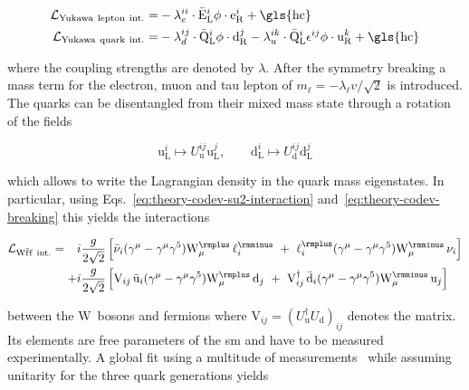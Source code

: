\begin{subequations}
\begin{align}
\mathcal{L}_\mathrm{Yukawa~lepton~int.}=&-\lambda_{e}^{ii}\cdot\bar{\mathrm{E}}^{i}_\mathrm{L}\phi\cdot\mathrm{e}^{i}_\mathrm{R}+\mathrm{\gls{hc}} \label{eq:theory-lepton-yukawa}\\
\mathcal{L}_\mathrm{Yukawa~quark~int.}=&-\lambda_{d}^{ij}\cdot\bar{\mathrm{Q}}^{i}_\mathrm{L}\phi\cdot\mathrm{d}^{j}_\mathrm{R}-\lambda_{u}^{ik}\cdot\bar{\mathrm{Q}}^{i}_\mathrm{L}\epsilon^{ij}\phi\cdot\mathrm{u}^{k}_\mathrm{R} +\mathrm{\gls{hc}} \label{eq:theory-quark-yukawa}
\end{align}
\end{subequations}

where the coupling strengths are denoted by $\lambda$. After the symmetry breaking a mass term for the electron, muon and tau lepton of $m_\ell=-\lambda_\ell v/\sqrt{2}$ is introduced. The quarks can be disentangled from their mixed mass state through a rotation of the fields 

\begin{equation}
\mathrm{u}^{i}_\mathrm{L}\mapsto U^{ij}_\mathrm{u}\mathrm{u}^{j}_\mathrm{L},\qquad \mathrm{d}^{i}_\mathrm{L}\mapsto U^{ij}_\mathrm{d}\mathrm{d}^{j}_\mathrm{L}
\end{equation}

which allows to write the Lagrangian density in the quark mass eigenstates. In particular, using Eqs.~\ref{eq:theory-codev-su2-interaction} and~\ref{eq:theory-codev-breaking} this yields the interactions

\begin{subequations}
\begin{align}
\mathcal{L}_{\mathrm{W}\bar{\mathrm{f}}\mathrm{f}~\mathrm{int.}}=\hphantom{+}i&\frac{g}{2\sqrt{2}}\,\Big[\bar{\nu}_{i}(\gamma^\mu-\gamma^\mu\gamma^5) \mathrm{W}^{\rmplus}_\mu\,\ell^{\rmminus}_{i}~+~{\ell}^{\rmplus}_{i}(\gamma^\mu-\gamma^\mu\gamma^5) \mathrm{W}^{\rmminus}_\mu\,\nu_{i}\Big]\nonumber\\
+i&\frac{g}{2\sqrt{2}}\,\Big[\mathrm{V}_{ij}\,\bar{\mathrm{u}}_{i}(\gamma^\mu-\gamma^\mu\gamma^5) \mathrm{W}^{\rmplus}_\mu\,\mathrm{d}_{j}~+~\mathrm{V}_{ij}^\dagger\,\bar{\mathrm{d}}_{i}(\gamma^\mu-\gamma^\mu\gamma^5) \mathrm{W}^{\rmminus}_\mu\,\mathrm{u}_{j}\Big] \label{eq:theory-qqW-int}
\end{align}
\end{subequations}

between the $\mathrm{W}$~bosons and fermions where $\mathrm{V}_{ij}=(U^\dagger_\mathrm{u}U_\mathrm{d})_{ij}$ denotes the  matrix. Its elements are free parameters of the \gls{sm} and have to be measured experimentally. A global fit using a multitude of measurements~\cite{Olive:2016xmw} while assuming unitarity for the three quark generations yields

